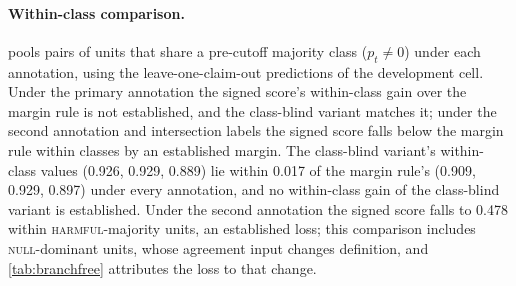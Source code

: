 \documentclass[11pt]{article}
\begin{document}
\paragraph{Within-class comparison.}  pools pairs of units that share a
pre-cutoff majority class ($p_t\neq0$) under each annotation, using the leave-one-claim-out
predictions of the development cell. Under the primary annotation the signed score's within-class gain
over the margin rule is not established, and the class-blind variant matches it; under the second
annotation and intersection labels the signed score falls below the margin rule within classes by an
established margin. The class-blind variant's within-class values (0.926, 0.929, 0.889) lie within 0.017 of the margin rule's (0.909, 0.929, 0.897) under every annotation, and no within-class gain of the class-blind variant is established. Under the
second annotation the signed score falls to 0.478 within \textsc{harmful}-majority units, an
established loss; this comparison includes \textsc{null}-dominant units, whose agreement input changes definition, and \cref{tab:branchfree} attributes the loss to that change.

\begin{table}[!t]\centering\footnotesize
\setlength{\tabcolsep}{3pt}
\caption{Within-class AUROC, development cell, each annotation rebuilt and refitted: pooled over
pairs sharing a majority class, and within each class (units, events in parentheses). Intervals: claim-clustered bootstrap, 2{,}000 resamples.}
\label{tab:withinclass}
\end{table}
\end{document}
